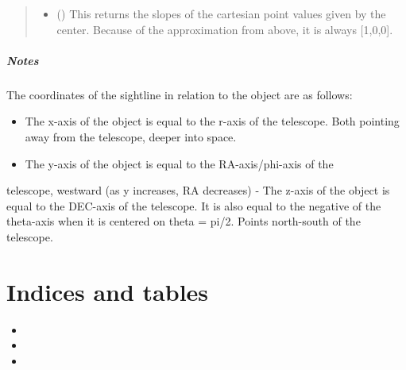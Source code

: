 \documentclass[letterpaper,10pt,english]{sphinxmanual}
\begin{document}
\begin{fulllineitems}
\begin{fulllineitems}
\begin{quote}
\begin{description}
\begin{itemize}
\item {} 
 () \textendash{} This returns the slopes of the cartesian point values given
by the center. Because of the approximation from above, it is
always {[}1,0,0{]}.

\end{itemize}


\end{description}\end{quote}
\paragraph{Notes}

The coordinates of the sightline in relation to the object are as
follows:
\begin{itemize}
\item {} 
The x-axis of the object is equal to the r-axis of the telescope. Both pointing away from the telescope, deeper into space.

\item {} 
The y-axis of the object is equal to the RA-axis/phi-axis of the

\end{itemize}

telescope, westward (as y increases, RA decreases)
- The z-axis of the object is equal to the DEC-axis of the telescope. It is also equal to the negative of the theta-axis
when it is centered on theta = pi/2. Points north-south of the
telescope.

\end{fulllineitems}


\end{fulllineitems}



\chapter{Indices and tables}
\label{\detokenize{index:indices-and-tables}}\begin{itemize}
\item {} 

\item {} 

\item {} 

\end{itemize}
\end{document}
